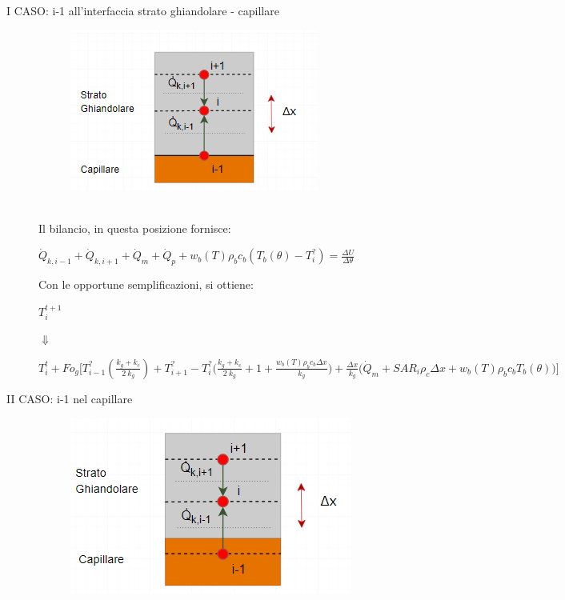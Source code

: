 \begin{description}
    \item[I CASO: i-1 all'interfaccia strato ghiandolare - capillare]
    \begin{figure}[H]
    \centering
    \includegraphics[width=.5\textwidth]{Immagini/Nodi/nodo18.1.png} 
    \label{nodo18.1}
\end{figure}
\noindent
\\Il bilancio, in questa posizione fornisce:
\begin{center}
	$ \Dot{Q} _{k, i-1} +\Dot{Q} _{k, i+1}+ \Dot{Q} _{m} +\Dot{Q} _{p}+ w_b (T) \rho _b c_b (T_b(\theta)-T_i ^?)= \frac{\Delta U}{\Delta \theta} $
\end{center}
Con le opportune semplificazioni, si ottiene:
\begin{center}
	$T_i ^{t+1} $
\end{center}
\begin{center}
	$\Downarrow$
\end{center}
\begin{center}
	$T_i ^t + Fo_{g} \Bigg[ T_{i-1} ^? (\frac{k_g+ k_{c}}{2 \: k_g}) + T_{i+1} ^?- T_i ^? \Big(\frac{k_g+ k_{c}}{2 \: k_g} + 1 + \frac{ w_b (T) \rho _b c_b \Delta x }{k_{g}} \Big) + \frac{\Delta x }{k_{g}} \Big(\Dot{Q} _{m} +  SAR_i \rho _{c} \Delta x + w_b (T) \rho _b c_b T_b(\theta)\Big) \Bigg]$
\end{center}


\item[II CASO: i-1 nel capillare]

     \begin{figure}[H]
    \centering
    \includegraphics[width=.6\textwidth]{Immagini/Nodi/nodo18.2.png} 
    \label{nodo18.2}
\end{figure}
\end{description}
